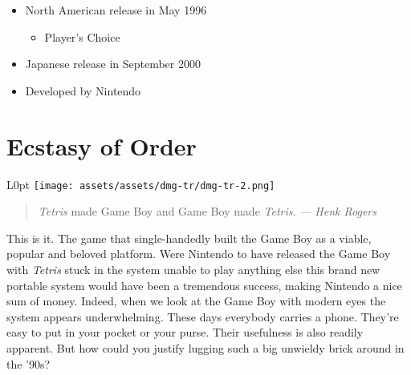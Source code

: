 \documentclass{book}
\begin{document}
\begin{itemize} [nosep]
\item North American release in May 1996
\begin{itemize} [nosep]\item Player’s Choice\end{itemize}\noindent






\item Japanese release in September 2000
































\item Developed by Nintendo

\end{itemize}\noindent

\newpage\FloatBarrier\needspace{10mm}\section*{Ecstasy of Order}\nopagebreak[4]
\begin{wrapfigure}{L}{0pt} \texttt{[image: assets/assets/dmg-tr/dmg-tr-2.png]}\end{wrapfigure}
\begin{quote}\emph{Tetris} made Game Boy and Game Boy made \emph{Tetris}.\newline \emph{ — Henk Rogers}\end{quote} \par
This is it. The game that single-handedly built the Game Boy as a viable, popular and beloved platform. Were Nintendo to have released the Game Boy with \emph{Tetris} stuck in the system unable to play anything else this brand new portable system would have been a tremendous success, making Nintendo a nice sum of money. Indeed, when we look at the Game Boy with modern eyes the system appears underwhelming. These days everybody carries a phone. They’re easy to put in your pocket or your purse. Their usefulness is also readily apparent. But how could you justify lugging such a big unwieldy brick around in the ’90s?
\end{document}
